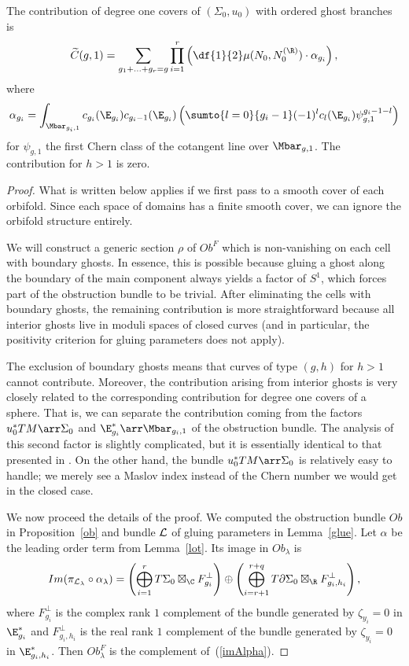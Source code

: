 \begin{proposition} \label{calc}
The contribution of degree one covers of $(\Sigma_0,u_0)$ with ordered ghost branches is
\[
\widetilde{C}(g,1) = \sum\limits_{g_1+\ldots+g_r=g} \prod\limits_{i=1}^r \left( \df{1}{2}\mu(N_0,N_0^{(\R)}) \cdot \alpha_{g_i} \right),
\]
where
\[
\alpha_{g_i} = \displaystyle\int_{\Mbar_{g_i,1}} c_{g_i}(\E_{g_i})c_{g_i-1}(\E_{g_i}) \left( \sumto{l=0}{g_i-1} (-1)^l c_l(\E_{g_i})\psi_{g,1}^{g_i-1-l} \right)
\]
for $\psi_{g,1}$ the first Chern class of the cotangent line over $\Mbar_{g,1}$. 
The contribution for $h>1$ is zero.
\begin{proof}
What is written below applies if we first pass to a smooth cover of each orbifold. Since each space of domains has a finite smooth cover, we can ignore the orbifold structure entirely.

We will construct a generic section $\rho$ of $Ob^F$ which is non-vanishing on each cell with boundary ghosts. In essence, this is possible because gluing a ghost along the boundary of the main component always yields a factor of $S^1$, which forces part of the obstruction bundle to be trivial. After eliminating the cells with boundary ghosts, the remaining contribution is more straightforward because all interior ghosts live in moduli spaces of closed curves (and in particular, the positivity criterion for gluing parameters does not apply).

The exclusion of boundary ghosts means that curves of type $(g,h)$ for $h>1$ cannot contribute. Moreover, the contribution arising from interior ghosts is very closely related to the corresponding contribution for degree one covers of a sphere. That is, we can separate the contribution coming from the factors $u_0^*TM \arr \Sigma_0$ and $\E_{g_i}^* \arr \Mbar_{g_i,1}$ of the obstruction bundle. The analysis of this second factor is slightly complicated, but it is essentially identical to that presented in \cite{pand}. On the other hand, the bundle $u_0^*TM \arr \Sigma_0$ is relatively easy to handle; we merely see a Maslov index instead of the Chern number we would get in the closed case.

We now proceed  the details of the proof. 
We computed the obstruction bundle $Ob$ in Proposition~\ref{ob} and bundle $\mathcal{L}$ of gluing parameters in Lemma~\ref{glue}. Let $\alpha$ be the leading order term from Lemma~\ref{lot}. Its image in $Ob_\lambda$ is 
\begin{equation}
Im(\pi_{\L_\lambda} \circ \alpha_\lambda) = \left( \bigoplus\limits_{i=1}^r T\Sigma_0 \boxtimes_\C F_{g_i}^\perp \right) \oplus \left( \bigoplus\limits_{i=r+1}^{r+q} T\partial\Sigma_0 \boxtimes_\R F_{g_i,h_i}^\perp \right), \label{imAlpha}
\end{equation}
where $F_{g_i}^\perp$ is the complex rank $1$ complement of the bundle generated by $\zeta_{y_i}=0$ in $\E_{g_i}^*$ and $F_{g_i,h_i}^\perp$ is the real rank $1$ complement of the bundle generated by $\zeta_{y_i}=0$ in $\E_{g_i,h_i}^*$. Then $Ob_\lambda^F$ is the complement of~(\ref{imAlpha}).


\end{proof}
\end{proposition}
